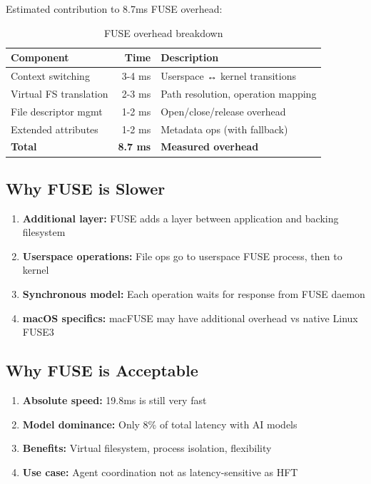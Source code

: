 \documentclass[11pt]{article}
\begin{document}
Estimated contribution to 8.7ms FUSE overhead:

\begin{table}[h]
\centering
\begin{tabular}{lrl}
\toprule
\textbf{Component} & \textbf{Time} & \textbf{Description} \\
\midrule
Context switching & 3-4 ms & Userspace ↔ kernel transitions \\
Virtual FS translation & 2-3 ms & Path resolution, operation mapping \\
File descriptor mgmt & 1-2 ms & Open/close/release overhead \\
Extended attributes & 1-2 ms & Metadata ops (with fallback) \\
\midrule
\textbf{Total} & \textbf{8.7 ms} & \textbf{Measured overhead} \\
\bottomrule
\end{tabular}
\caption{FUSE overhead breakdown}
\end{table}

\subsection{Why FUSE is Slower}

\begin{enumerate}
\item \textbf{Additional layer:} FUSE adds a layer between application and backing filesystem
\item \textbf{Userspace operations:} File ops go to userspace FUSE process, then to kernel
\item \textbf{Synchronous model:} Each operation waits for response from FUSE daemon
\item \textbf{macOS specifics:} macFUSE may have additional overhead vs native Linux FUSE3
\end{enumerate}

\subsection{Why FUSE is Acceptable}

\begin{enumerate}
\item \textbf{Absolute speed:} 19.8ms is still very fast
\item \textbf{Model dominance:} Only 8\% of total latency with AI models
\item \textbf{Benefits:} Virtual filesystem, process isolation, flexibility
\item \textbf{Use case:} Agent coordination not as latency-sensitive as HFT
\end{enumerate}
\end{document}
